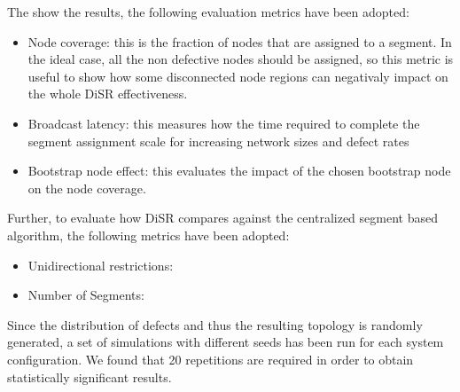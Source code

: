 The show the results, the following evaluation metrics have been adopted:
\begin{itemize}
\item{Node coverage}: this is the fraction of nodes that
are assigned to a segment. In the ideal case, all the non defective
nodes should be assigned, so this metric is useful to show how some
disconnected node regions can negativaly impact on the whole DiSR
effectiveness.
\item{Broadcast latency}: this measures how the time required to complete the
segment assignment scale for increasing network sizes and defect rates
\item{Bootstrap node effect}: this evaluates the impact of the chosen
bootstrap node on the node coverage.
\end{itemize}

Further, to evaluate how DiSR compares against the centralized segment
based algorithm, the following metrics have been adopted:
\begin{itemize}
\item {Unidirectional restrictions:}
\item {Number of Segments}:
\end{itemize}

Since the distribution of defects and thus the resulting topology is randomly
generated, a set of simulations with different seeds has been run
for each system configuration. We found that 20 repetitions are
required in order to obtain statistically significant results.

